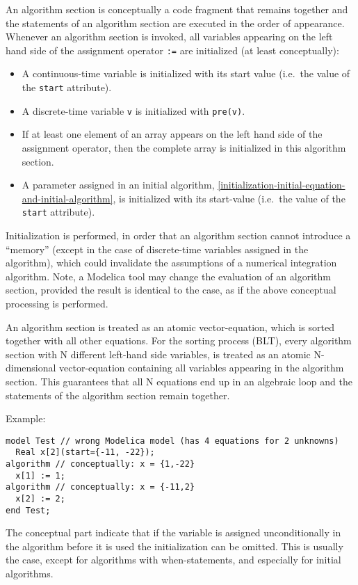 An algorithm section is conceptually a code fragment that remains
together and the statements of an algorithm section are executed in the
order of appearance. Whenever an algorithm section is invoked, all
variables appearing on the left hand side of the assignment operator
\lstinline!:=! are initialized (at least conceptually):
\begin{itemize}
\item
  A continuous-time variable is initialized with its start value (i.e.\ the
  value of the \lstinline!start! attribute).
\item
  A discrete-time variable \lstinline!v! is initialized with \lstinline!pre(v)!.
\item
  If at least one element of an array appears on the left hand side of
  the assignment operator, then the complete array is initialized in
  this algorithm section.
\item
  A parameter assigned in an initial algorithm, \cref{initialization-initial-equation-and-initial-algorithm},
  is initialized with its start-value (i.e.\ the value of the \lstinline!start! attribute).
\end{itemize}

\begin{nonnormative}
Initialization is performed, in order that an algorithm section
cannot introduce a ``memory'' (except in the case of discrete-time variables assigned in the algorithm), which could invalidate the assumptions of a
numerical integration algorithm. Note, a Modelica tool may change the
evaluation of an algorithm section, provided the result is identical to
the case, as if the above conceptual processing is performed.

An algorithm section is treated as an atomic vector-equation,
which is sorted together with all other equations. For the sorting
process (BLT), every algorithm section with N different left-hand side
variables, is treated as an atomic N-dimensional vector-equation
containing all variables appearing in the algorithm section. This
guarantees that all N equations end up in an algebraic loop and the
statements of the algorithm section remain together.

Example:
\begin{lstlisting}[language=modelica]
model Test // wrong Modelica model (has 4 equations for 2 unknowns)
  Real x[2](start={-11, -22});
algorithm // conceptually: x = {1,-22}
  x[1] := 1;
algorithm // conceptually: x = {-11,2}
  x[2] := 2;
end Test;
\end{lstlisting}

The conceptual part indicate that if the variable is assigned unconditionally
in the algorithm before it is used the initialization can be omitted.
This is usually the case, except for algorithms with when-statements,
and especially for initial algorithms.
\end{nonnormative}

